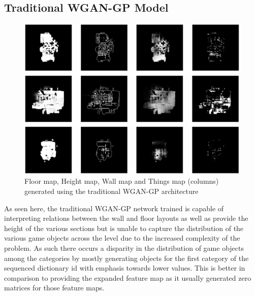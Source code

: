 \documentclass{Configuration_Files/PoliMi3i_thesis}
\begin{document}
\subsection{Traditional WGAN-GP Model}
\begin{figure}[H]
    \centering
    \includegraphics[width=1\textwidth]{wgan_sample.jpg}
    \caption[Samples generated using the traditional WGAN-GP architecture]{Floor map, Height map, Wall map and Things map (columns) generated using the traditional WGAN-GP architecture}
    \label{fig:wgansample}
\end{figure}
As seen here, the traditional WGAN-GP network trained is capable of interpreting 
relations between the wall and floor layouts as well as provide the height of the 
various sections but is unable to capture the distribution of the various game objects 
across the level due to the increased complexity of the problem. As such there occurs 
a disparity in the distribution of game objects among the categories by mostly 
generating objects for the first category of the sequenced dictionary id with emphasis 
towards lower values. This is better in comparison to providing the expanded feature 
map as it usually generated zero matrices for those feature maps.
\end{document}
